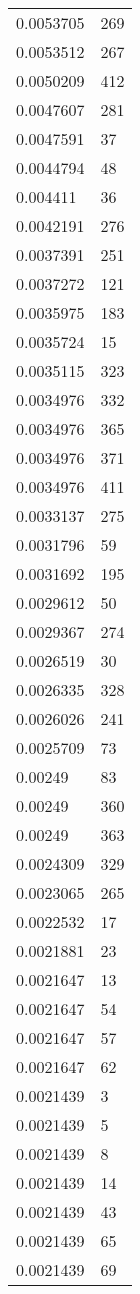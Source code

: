 \begin{tabular}{ll}
0.0053705 & 269 \\ 
0.0053512 & 267 \\ 
0.0050209 & 412 \\ 
0.0047607 & 281 \\ 
0.0047591 & 37 \\ 
0.0044794 & 48 \\ 
0.004411 & 36 \\ 
0.0042191 & 276 \\ 
0.0037391 & 251 \\ 
0.0037272 & 121 \\ 
0.0035975 & 183 \\ 
0.0035724 & 15 \\ 
0.0035115 & 323 \\ 
0.0034976 & 332 \\ 
0.0034976 & 365 \\ 
0.0034976 & 371 \\ 
0.0034976 & 411 \\ 
0.0033137 & 275 \\ 
0.0031796 & 59 \\ 
0.0031692 & 195 \\ 
0.0029612 & 50 \\ 
0.0029367 & 274 \\ 
0.0026519 & 30 \\ 
0.0026335 & 328 \\ 
0.0026026 & 241 \\ 
0.0025709 & 73 \\ 
0.00249 & 83 \\ 
0.00249 & 360 \\ 
0.00249 & 363 \\ 
0.0024309 & 329 \\ 
0.0023065 & 265 \\ 
0.0022532 & 17 \\ 
0.0021881 & 23 \\ 
0.0021647 & 13 \\ 
0.0021647 & 54 \\ 
0.0021647 & 57 \\ 
0.0021647 & 62 \\ 
0.0021439 & 3 \\ 
0.0021439 & 5 \\ 
0.0021439 & 8 \\ 
0.0021439 & 14 \\ 
0.0021439 & 43 \\ 
0.0021439 & 65 \\ 
0.0021439 & 69 \\ 

\end{tabular}
